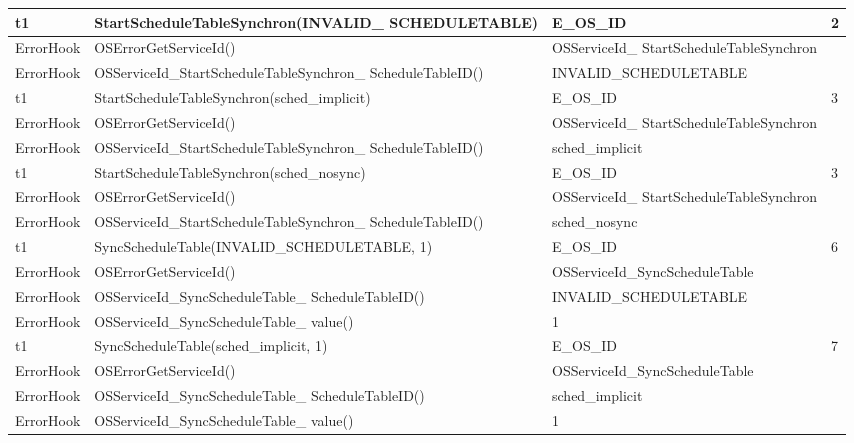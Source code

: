 \documentclass[10pt]{article}
\newlength{\Li}\settowidth{\Li}{Running}
\newlength{\Lii}\setlength{\Lii}{7cm}
\newlength{\Liiii}\setlength{\Liiii}{0.9cm}
\newlength{\Liii}\setlength{\Liii}{\textwidth} \addtolength{\Liii}{-\Li} \addtolength{\Liii}{-\Lii} \addtolength{\Liii}{-\Liiii}
\begin{document}
	\begin{supertabular}{|p{\Li}|p{\Lii}|p{\Liii}|p{\Liiii}|} \hline 
	t1		& StartScheduleTableSynchron(INVALID\_ SCHEDULETABLE)				& E\_OS\_ID										& 2 \\ \hline
	ErrorHook	& OSErrorGetServiceId()												& OSServiceId\_ StartScheduleTableSynchron				& \\ \hline
	ErrorHook	& OSServiceId\_StartScheduleTableSynchron\_ ScheduleTableID()			& INVALID\_SCHEDULETABLE						& \\ \hline
	
	t1		& StartScheduleTableSynchron(sched\_implicit)							& E\_OS\_ID										& 3 \\ \hline
	ErrorHook	& OSErrorGetServiceId()												& OSServiceId\_ StartScheduleTableSynchron				& \\ \hline
	ErrorHook	& OSServiceId\_StartScheduleTableSynchron\_ ScheduleTableID()			& sched\_implicit									& \\ \hline
	
	t1		& StartScheduleTableSynchron(sched\_nosync)							& E\_OS\_ID										& 3 \\ \hline
	ErrorHook	& OSErrorGetServiceId()												& OSServiceId\_ StartScheduleTableSynchron				& \\ \hline
	ErrorHook	& OSServiceId\_StartScheduleTableSynchron\_ ScheduleTableID()			& sched\_nosync									& \\ \hline
	
	t1		& SyncScheduleTable(INVALID\_SCHEDULETABLE, 1)						& E\_OS\_ID										& 6 \\ \hline
	ErrorHook	& OSErrorGetServiceId()												& OSServiceId\_SyncScheduleTable					& \\ \hline
	ErrorHook	& OSServiceId\_SyncScheduleTable\_ ScheduleTableID()					& INVALID\_SCHEDULETABLE						& \\ \hline
	ErrorHook	& OSServiceId\_SyncScheduleTable\_ value()								& 1												& \\ \hline

	t1		& SyncScheduleTable(sched\_implicit, 1)									& E\_OS\_ID										& 7 \\ \hline
	ErrorHook	& OSErrorGetServiceId()												& OSServiceId\_SyncScheduleTable					& \\ \hline
	ErrorHook	& OSServiceId\_SyncScheduleTable\_ ScheduleTableID()					& sched\_implicit									& \\ \hline
	ErrorHook	& OSServiceId\_SyncScheduleTable\_ value()								& 1												& \\ \hline


\end{supertabular}
\end{document}
